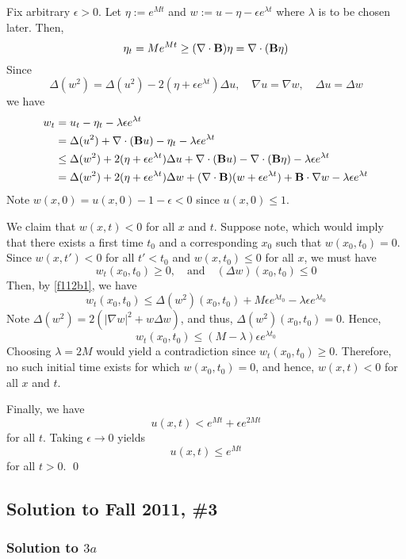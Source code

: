 Fix arbitrary $\epsilon > 0$. Let $\eta := e^{Mt}$ and $w := u - \eta - \epsilon e^{\lambda t}$ where $\lambda$ is to be chosen later. Then,
$$ \eta_t = Me^{Mt} \geq (\nabla \cdot \textbf{B}) \eta = \nabla \cdot (\textbf{B} \eta) $$
Since
$$ \Delta (w^2) = \Delta (u^2) - 2(\eta + \epsilon e^{\lambda t}) \Delta u, \quad \nabla u = \nabla w, \quad \Delta u = \Delta w $$
we have
\begin{align}
\notag w_t &= u_t - \eta_t  - \lambda \epsilon e^{\lambda t} \\
\notag &= \Delta (u^2) + \nabla \cdot (\textbf{B} u) - \eta_t - \lambda \epsilon e^{\lambda t} \\
\notag &\leq \Delta (w^2) + 2(\eta + \epsilon e^{\lambda t}) \Delta u + \nabla \cdot (\textbf{B} u) - \nabla \cdot (\textbf{B} \eta) - \lambda \epsilon e^{\lambda t} \\
\label{f112b1} &= \Delta (w^2) + 2(\eta + \epsilon e^{\lambda t}) \Delta w + (\nabla \cdot \textbf{B})(w + \epsilon e^{\lambda t}) + \textbf{B} \cdot \nabla w - \lambda \epsilon e^{\lambda t}
\end{align}
Note $w(x,0) = u(x,0) - 1 - \epsilon < 0$ since $u(x,0) \leq 1$.

We claim that $w(x,t) < 0$ for all $x$ and $t$. Suppose note, which would imply that there exists a first time $t_0$ and a corresponding $x_0$ such that $w(x_0,t_0) = 0$. Since $w(x,t') < 0$ for all $t' < t_0$ and $w(x,t_0) \leq 0$ for all $x$, we must have
$$ w_t(x_0,t_0) \geq 0, \quad \text{and} \quad (\Delta w)(x_0,t_0) \leq 0 $$
Then, by \eqref{f112b1}, we have
$$ w_t(x_0,t_0) \leq \Delta (w^2)(x_0,t_0) + M \epsilon e^{\lambda t_0} - \lambda \epsilon e^{\lambda t_0} $$
Note $\Delta (w^2) = 2 (\left| \nabla w \right|^2 + w \Delta w)$, and thus, $\Delta (w^2)(x_0,t_0) = 0$. Hence,
$$ w_t(x_0,t_0) \leq (M-\lambda)\epsilon e^{\lambda t_0} $$
Choosing $\lambda = 2M$ would yield a contradiction since $w_t(x_0,t_0) \geq 0$. Therefore, no such initial time exists for which $w(x_0,t_0) = 0$, and hence, $w(x,t) < 0$ for all $x$ and $t$.

Finally, we have
$$ u(x,t) < e^{Mt} + \epsilon e^{2Mt} $$
for all $t$. Taking $\epsilon \to 0$ yields
$$ u(x,t) \leq e^{Mt} $$
for all $t>0$. \hfill \qed

\subsection*{Solution to Fall 2011, \#3}
\label{F11Q3}

\subsubsection*{Solution to $3a$}


